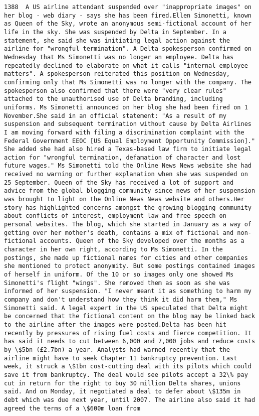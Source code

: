 \documentclass[11pt]{article}
\begin{document}
\begin{Verbatim}[commandchars=\\\{\}]
         1388  A US airline attendant suspended over "inappropriate images" on her blog - web diary - says she has been fired.Ellen Simonetti, known as Queen of the Sky, wrote an anonymous semi-fictional account of her life in the sky. She was suspended by Delta in September. In a statement, she said she was initiating legal action against the airline for "wrongful termination". A Delta spokesperson confirmed on Wednesday that Ms Simonetti was no longer an employee. Delta has repeatedly declined to elaborate on what it calls "internal employee matters". A spokesperson reiterated this position on Wednesday, confirming only that Ms Simonetti was no longer with the company. The spokesperson also confirmed that there were "very clear rules" attached to the unauthorised use of Delta branding, including uniforms. Ms Simonetti announced on her blog she had been fired on 1 November.She said in an official statement: "As a result of my suspension and subsequent termination without cause by Delta Airlines I am moving forward with filing a discrimination complaint with the Federal Government EEOC [US Equal Employment Opportunity Commission]." She added she had also hired a Texas-based law firm to initiate legal action for "wrongful termination, defamation of character and lost future wages." Ms Simonetti told the Online News News website she had received no warning or further explanation when she was suspended on 25 September. Queen of the Sky has received a lot of support and advice from the global blogging community since news of her suspension was brought to light on the Online News News website and others.Her story has highlighted concerns amongst the growing blogging community about conflicts of interest, employment law and free speech on personal websites. The blog, which she started in January as a way of getting over her mother's death, contains a mix of fictional and non-fictional accounts. Queen of the Sky developed over the months as a character in her own right, according to Ms Simonetti. In the postings, she made up fictional names for cities and other companies she mentioned to protect anonymity. But some postings contained images of herself in uniform. Of the 10 or so images only one showed Ms Simonetti's flight "wings". She removed them as soon as she was informed of her suspension. "I never meant it as something to harm my company and don't understand how they think it did harm them," Ms Simonetti said. A legal expert in the US speculated that Delta might be concerned that the fictional content on the blog may be linked back to the airline after the images were posted.Delta has been hit recently by pressures of rising fuel costs and fierce competition. It has said it needs to cut between 6,000 and 7,000 jobs and reduce costs by \$5bn (£2.7bn) a year. Analysts had warned recently that the airline might have to seek Chapter 11 bankruptcy prevention. Last week, it struck a \$1bn cost-cutting deal with its pilots which could save it from bankruptcy. The deal would see pilots accept a 32\% pay cut in return for the right to buy 30 million Delta shares, unions said. And on Monday, it negotiated a deal to defer about \$135m in debt which was due next year, until 2007. The airline also said it had agreed the terms of a \$600m loan from 
\end{Verbatim}
\end{document}
